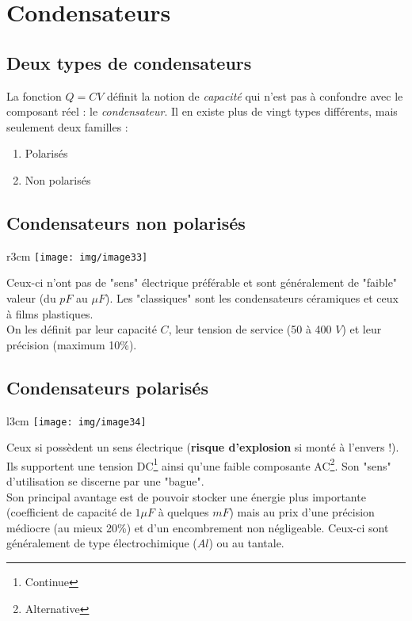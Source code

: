\section{Condensateurs}
\subsection{Deux types de condensateurs}
La fonction $Q = CV$ définit la notion de \textit{capacité} qui n'est pas à confondre avec le composant réel : le \textit{condensateur}. Il en existe plus de vingt types différents, mais seulement deux familles : 
\begin{enumerate}
	\item Polarisés
	\item Non polarisés
\end{enumerate}

\subsection{Condensateurs non polarisés}
\begin{wrapfigure}[6]{r}{3cm}
	\texttt{[image: img/image33]}
\end{wrapfigure}
Ceux-ci n'ont pas de "sens" électrique préférable et sont généralement de "faible" valeur (du $pF$ au $\mu F$). Les "classiques" sont les condensateurs céramiques et ceux à films plastiques.\\

On les définit par leur capacité $C$, leur tension de service (50 à 400 $V$) et leur précision (maximum 10\%).

\newpage
\subsection{Condensateurs polarisés}
\begin{wrapfigure}[8]{l}{3cm}
	\texttt{[image: img/image34]}
\end{wrapfigure}
Ceux si possèdent un sens électrique (\textbf{risque d'explosion} si monté à l'envers !). Ils supportent une tension DC\footnote{Continue} ainsi qu'une faible composante AC\footnote{Alternative}. Son "sens" d'utilisation se discerne par une "bague".\\

Son principal avantage est de pouvoir stocker une énergie plus importante (coefficient de capacité de $1\mu F$ à quelques $mF$) mais au prix d'une précision médiocre (au mieux 20\%) et d'un encombrement non négligeable. Ceux-ci sont généralement de type électrochimique ($Al$) ou au tantale.


